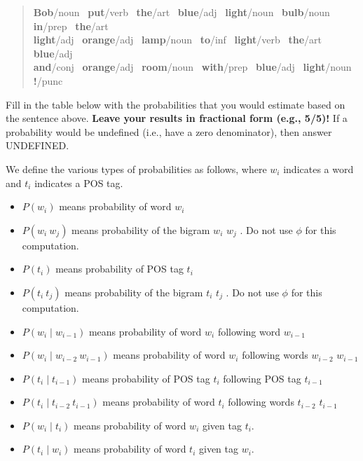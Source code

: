 \documentclass[11pt]{article}
\begin{document}
\begin{enumerate}
\begin{quote}
{\bf Bob}/{\sc noun~} {\bf put}/{\sc verb~} {\bf the}/{\sc art~}  {\bf blue}/{\sc adj~}
{\bf light}/{\sc noun~}  {\bf bulb}/{\sc noun~} {\bf in}/{\sc prep~}
{\bf the}/{\sc art~} \\
{\bf light}/{\sc adj~}  {\bf orange}/{\sc adj~}   {\bf lamp}/{\sc noun~}  
{\bf to}/{\sc inf~} {\bf light}/{\sc verb~} 
{\bf the}/{\sc art~} {\bf blue}/{\sc adj~} \\
  {\bf and}/{\sc conj~} {\bf
  orange}/{\sc adj~}  {\bf room}/{\sc noun~} 
{\bf with}/{\sc prep~} {\bf blue}/{\sc adj~}  {\bf light}/{\sc noun~}
{\bf !}/{\sc punc}
\end{quote}
\vspace*{.1in}

Fill in the table below with the probabilities that you would estimate
based on the sentence above. {\bf Leave your results in fractional
  form (e.g., 5/5)!}  If a probability would be undefined (i.e.,
have a zero denominator), then answer UNDEFINED. 

\vspace*{.1in}
We define the various types of probabilities as follows, where $w_i$
indicates a word and $t_i$ indicates a POS tag. 

\begin{itemize}
\item $P(w_i)$ means probability of word $w_i$
\item $P(w_i~w_j)$ means probability of the bigram $w_i$ $w_j$ . Do not use $\phi$ for this computation.
\item $P(t_i)$ means probability of POS tag $t_i$
\item $P(t_i~t_j)$ means probability of the bigram $t_i$ $t_j$ . Do not use $\phi$ for this computation.
\item $P(w_i \mid w_{i-1})$ means probability of word   $w_i$   following word $w_{i-1}$
\item$P(w_i \mid w_{i-2}~w_{i-1})$ means probability of word $w_i$  following words $w_{i-2}$ $w_{i-1}$ 
\item$P(t_i \mid t_{i-1})$ means probability of POS  tag $t_i$ following POS tag $t_{i-1}$
\item$P(t_i \mid t_{i-2}~t_{i-1})$ means probability of word $t_i$ following words $t_{i-2}$ $t_{i-1}$
\item$P(w_i \mid t_i)$ means  probability of word $w_i$ given tag $t_i$.
\item$P(t_i \mid w_i)$ means  probability of word $t_i$ given tag $w_i$.
\end{itemize}


\end{enumerate}
\end{document}
